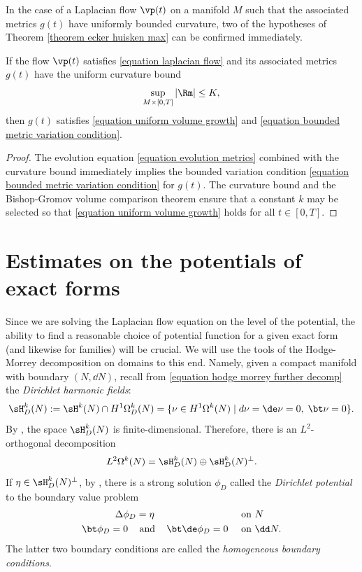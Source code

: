 \documentclass[hidelinks, 12pt, oneside, reqno]{amsart}
\begin{document}
In the case of a Laplacian flow $\vp(t)$ on a manifold $M$ such that the associated metrics $g(t)$ have uniformly bounded curvature, two of the hypotheses of Theorem \ref{theorem ecker huisken max} can be confirmed immediately.

\begin{lem}\label{lemma confirm volume and variation bound}
If the flow $\vp(t)$ satisfies \eqref{equation laplacian flow} and its associated metrics $g(t)$ have the uniform curvature bound 
\[
\sup_{M \times [0,T]} |\Rm| \le K,
\]
then $g(t)$ satisfies \eqref{equation uniform volume growth} and \eqref{equation bounded metric variation condition}. 
\end{lem}

\begin{proof}
    The evolution equation \eqref{equation evolution metrics} combined with the curvature bound immediately implies the bounded variation condition \eqref{equation bounded metric variation condition} for $g(t)$. The curvature bound and the Bishop-Gromov volume comparison theorem ensure that a constant $k$ may be selected so that \eqref{equation uniform volume growth} holds for all $t \in [0,T]$.
\end{proof}

\section{Estimates on the potentials of exact forms} \label{section estimates potential}

Since we are solving the Laplacian flow equation on the level of the potential, the ability to find a reasonable choice of potential function for a given exact form (and likewise for families) will be crucial. We will use the tools of the Hodge-Morrey decomposition on domains to this end. Namely, given a compact manifold with boundary $(N, \dd N)$, recall from \eqref{equation hodge morrey further decomp} the \emph{Dirichlet harmonic fields}:
\[
\sH^k_D(N) := \sH^k(N) \cap H^1\Omega^k_D(N) = \{\nu \in H^1 \Omega^k(N)\; |\; d\nu = \de \nu = 0, \; \bt \nu = 0\}.
\]
By \cite[Theorem 2.2.2]{HodgeDecompSchwarz}, the space $\sH^k_D(N)$ is finite-dimensional. Therefore, there is an $L^2$-orthogonal decomposition 
\[
L^2\Omega^k(N) = \sH^k_D(N) \oplus \sH^k_D(N)^\perp. 
\]
If $\eta \in \sH^k_D(N)^\perp$, by \cite[Theorems 2.2.4-6]{HodgeDecompSchwarz}, there is a strong solution $\phi_D$ called the \emph{Dirichlet potential} to the boundary value problem 
\begin{align}\label{equation dirichlet potential bvp}
    \begin{aligned}
    \Delta \phi_D &= \eta \\
    \bt \phi_D = 0 \;\;\;&\text{ and }\;\;\; \bt \de \phi_D = 0
    \end{aligned}
    &&
    \begin{aligned}
        &\text{ on }N\\
     &\text{ on }\dd N. 
    \end{aligned}
\end{align}
The latter two boundary conditions are called the \emph{homogeneous boundary conditions}. 
\end{document}
